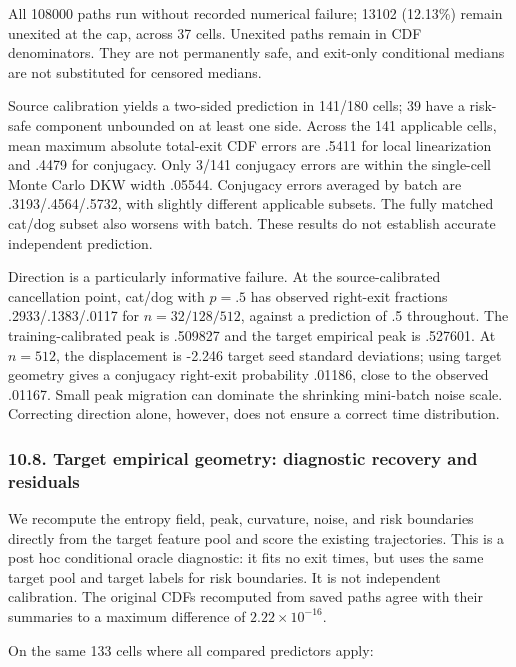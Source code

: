 All 108000 paths run without recorded numerical failure; 13102 (12.13\%)
remain unexited at the cap, across 37 cells. Unexited paths remain in
CDF denominators. They are not permanently safe, and exit-only
conditional medians are not substituted for censored medians.

Source calibration yields a two-sided prediction in 141/180 cells; 39
have a risk-safe component unbounded on at least one side. Across the
141 applicable cells, mean maximum absolute total-exit CDF errors are
.5411 for local linearization and .4479 for conjugacy. Only 3/141
conjugacy errors are within the single-cell Monte Carlo DKW width
.05544. Conjugacy errors averaged by batch are .3193/.4564/.5732, with
slightly different applicable subsets. The fully matched cat/dog subset
also worsens with batch. These results do not establish accurate
independent prediction.

Direction is a particularly informative failure. At the
source-calibrated cancellation point, cat/dog with \(p=.5\) has observed
right-exit fractions .2933/.1383/.0117 for \(n=32/128/512\), against a
prediction of .5 throughout. The training-calibrated peak is .509827 and
the target empirical peak is .527601. At \(n=512\), the displacement is
-2.246 target seed standard deviations; using target geometry gives a
conjugacy right-exit probability .01186, close to the observed .01167.
Small peak migration can dominate the shrinking mini-batch noise scale.
Correcting direction alone, however, does not ensure a correct time
distribution.

\subsubsection{10.8. Target empirical geometry: diagnostic recovery and
residuals}\label{experiments-target-empirical-geometry-diagnostic-recovery-and-residuals}

We recompute the entropy field, peak, curvature, noise, and risk
boundaries directly from the target feature pool and score the existing
trajectories. This is a post hoc conditional oracle diagnostic: it fits
no exit times, but uses the same target pool and target labels for risk
boundaries. It is not independent calibration. The original CDFs
recomputed from saved paths agree with their summaries to a maximum
difference of \(2.22\times10^{-16}\).

On the same 133 cells where all compared predictors apply:

